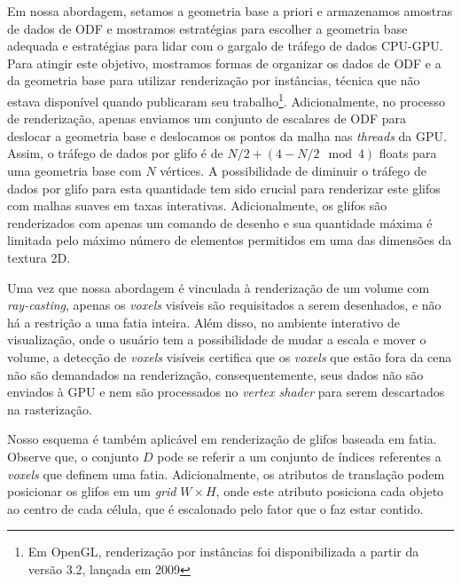 \documentclass[
    12pt,                %
    oneside,            %
    a4paper,            %
    english,            %
    french,                %
    spanish,            %
    brazil                %
    ]{abntex2}
\begin{document}
Em nossa abordagem, setamos a geometria base a priori e armazenamos amostras de dados de ODF e mostramos estratégias para escolher a geometria base adequada e estratégias para lidar com o gargalo de tráfego de dados CPU-GPU. Para atingir este objetivo, mostramos formas de organizar os dados de ODF e a da geometria base para utilizar renderização por instâncias, técnica que não estava disponível quando  publicaram seu trabalho\footnote{Em OpenGL, renderização por instâncias foi disponibilizada a partir da versão 3.2, lançada em 2009}. Adicionalmente, no processo de renderização, apenas enviamos um conjunto de escalares de ODF para deslocar a geometria base e deslocamos os pontos da malha nas \textit{threads} da GPU. Assim, o tráfego de dados por glifo é de $N/2 + (4-N/2 \mod{4})$ floats para uma geometria base com $N$ vértices. A possibilidade de diminuir o tráfego de dados por glifo para esta quantidade tem sido crucial para renderizar este glifos com malhas suaves em taxas interativas. Adicionalmente, os glifos são renderizados com apenas um comando de desenho e sua quantidade máxima é limitada pelo máximo número de elementos permitidos em uma das dimensões da textura 2D.

Uma vez que nossa abordagem é vinculada à renderização de um volume com \textit{ray-casting}, apenas os \textit{voxels} visíveis são requisitados a serem desenhados, e não há a restrição a uma fatia inteira. Além disso, no ambiente interativo de visualização, onde o usuário tem a possibilidade de mudar a escala e mover o volume, a detecção de \textit{voxels} visíveis certifica que os \textit{voxels} que estão fora da cena não são demandados na renderização, consequentemente, seus dados não são enviados à GPU e nem são processados no \textit{vertex shader} para serem descartados na rasterização.

Nosso esquema é também aplicável em renderização de glifos baseada em fatia. Observe que, o conjunto $D$ pode se referir a um conjunto de índices referentes a \textit{voxels} que definem uma fatia. Adicionalmente, os atributos de translação podem posicionar os glifos em um \textit{grid} $W \times H$, onde este atributo posiciona cada objeto ao centro de cada célula, que é escalonado pelo fator que o faz estar contido.

\end{document}

